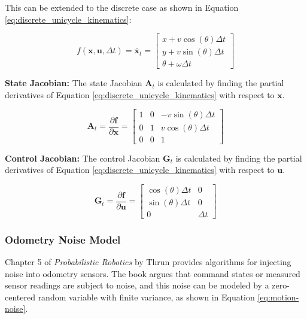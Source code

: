 This can be extended to the discrete case as shown in Equation \ref{eq:discrete_unicycle_kinematics}:

\begin{equation}\label{eq:discrete_unicycle_kinematics}
    f(\textbf{x},\textbf{u},\Delta t) = \bar{\textbf{x}}_t = \begin{bmatrix}
        x + v \cos(\theta) \Delta t \\ y + v \sin(\theta) \Delta t \\ \theta + \omega \Delta t
    \end{bmatrix}
\end{equation}

\textbf{State Jacobian:} The state Jacobian $\textbf{A}_t$ is calculated by finding the partial derivatives of Equation \ref{eq:discrete_unicycle_kinematics} with respect to $\textbf{x}$.

\begin{equation}\label{eq:state_jacobian_unicycle}
    \textbf{A}_t = \frac{\partial \textbf{f}}{\partial \textbf{x}} = 
    \begin{bmatrix} 
        1 & 0 & -v \sin(\theta) \Delta t \\
        0 & 1 &  v \cos(\theta) \Delta t \\
        0 & 0 & 1
    \end{bmatrix}
\end{equation}

\textbf{Control Jacobian:} The control Jacobian $\textbf{G}_t$ is calculated by finding the partial derivatives of Equation \ref{eq:discrete_unicycle_kinematics} with respect to $\textbf{u}$.

\begin{equation}\label{eq:control_jacobian_unicycle}
    \textbf{G}_t = \frac{\partial \textbf{f}}{\partial \textbf{u}} = 
    \begin{bmatrix} 
        \cos(\theta) \Delta t & 0  \\
        \sin(\theta) \Delta t & 0  \\
        0 & \Delta t
    \end{bmatrix}
\end{equation}

\subsubsection{Odometry Noise Model}
Chapter 5 of \textit{Probabilistic Robotics} by Thrun \cite{thrun2005probabilistic} provides algorithms for injecting noise into odometry sensors.
The book argues that command states or measured sensor readings are subject to noise, and this noise can be modeled by a zero-centered random variable with finite variance, as shown in Equation \ref{eq:motion-noise}.


